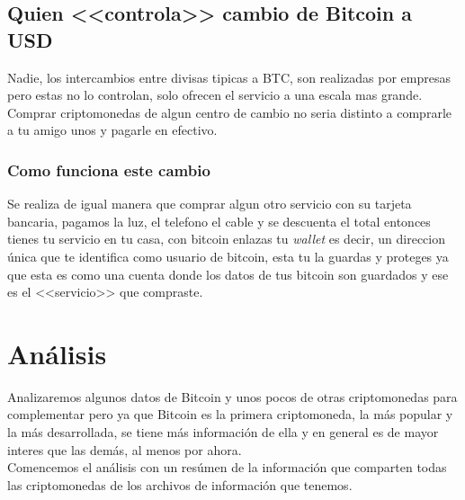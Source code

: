 \documentclass[12pt,letterpaper]{article}
\begin{document}
	\subsection*{Quien <<controla>> cambio de Bitcoin a USD}
	Nadie, los intercambios entre divisas tipicas a BTC, son realizadas por empresas pero estas no lo controlan, solo ofrecen el servicio a una escala mas grande. Comprar criptomonedas de algun centro de cambio no seria distinto a comprarle a tu amigo unos y pagarle en efectivo.

		\subsubsection*{Como funciona este cambio}
        Se realiza de igual manera que comprar algun otro servicio con su tarjeta bancaria, pagamos la luz, el telefono el cable y se descuenta el total entonces tienes tu servicio en tu casa, con bitcoin enlazas tu \textit{wallet} es decir, un direccion \'unica que te identifica como usuario de bitcoin, esta tu la guardas y proteges ya que esta es como una cuenta donde los datos de tus bitcoin son guardados y ese es el <<servicio>> que compraste.










\newpage

\section{An\'alisis}

    Analizaremos algunos datos de Bitcoin y unos pocos de otras criptomonedas para complementar pero ya que Bitcoin es la primera criptomoneda, la m\'as popular y la m\'as desarrollada, se tiene m\'as informaci\'on de ella y en general es de mayor interes que las dem\'as, al menos por ahora.
    \\
    Comencemos el an\'alisis con un res\'umen de la informaci\'on que comparten todas las criptomonedas de los archivos de informaci\'on que tenemos.
\end{document}
